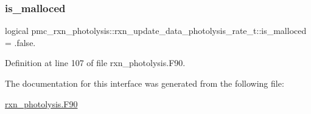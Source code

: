 \subsubsection{\texorpdfstring{is\+\_\+malloced}{is\_malloced}}
{\footnotesize\ttfamily logical pmc\+\_\+rxn\+\_\+photolysis\+::rxn\+\_\+update\+\_\+data\+\_\+photolysis\+\_\+rate\+\_\+t\+::is\+\_\+malloced = .false.\hspace{0.3cm}{\ttfamily [private]}}



Definition at line 107 of file rxn\+\_\+photolysis.\+F90.



The documentation for this interface was generated from the following file\+:\begin{DoxyCompactItemize}
\item 
\mbox{\hyperlink{rxn__photolysis_8_f90}{rxn\+\_\+photolysis.\+F90}}\end{DoxyCompactItemize}
